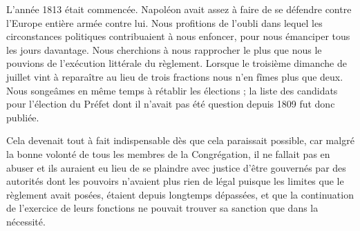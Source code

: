 L'année 1813 était commencée. Napoléon avait assez à faire de se défendre contre l'Europe entière armée contre lui. Nous profitions de l'oubli dans lequel les circonstances politiques
contribuaient à nous enfoncer, pour nous émanciper tous les jours davantage. Nous cherchions à nous rapprocher le plus que nous le pouvions de l'exécution littérale du règlement. Lorsque le troisième dimanche de juillet vint à reparaître au lieu de trois fractions nous n'en fîmes plus que deux. Nous songeâmes en même temps à rétablir les élections ; la liste des candidats pour l'élection du Préfet dont il n'avait pas été question depuis 1809 fut donc publiée.

Cela devenait tout à fait indispensable dès que cela paraissait possible, car malgré la bonne volonté de tous les membres de la Congrégation, il ne fallait pas en abuser et ils auraient eu lieu de se plaindre avec justice d'être gouvernés par des autorités dont les pouvoirs n'avaient plus rien de légal puisque les limites que le règlement avait posées, étaient depuis longtemps dépassées, et que la continuation de l'exercice de leurs fonctions ne pouvait trouver sa sanction que dans la nécessité.

